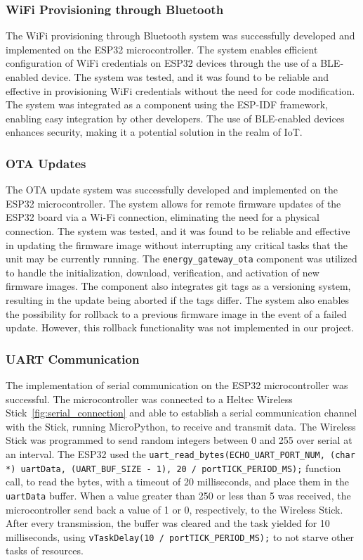\subsubsection{WiFi Provisioning through Bluetooth}

The WiFi provisioning through Bluetooth system was successfully developed and implemented on the ESP32 microcontroller. The system enables efficient configuration of WiFi credentials on ESP32 devices through the use of a BLE-enabled device. The system was tested, and it was found to be reliable and effective in provisioning WiFi credentials without the need for code modification. The system was integrated as a component using the ESP-IDF framework, enabling easy integration by other developers. The use of BLE-enabled devices enhances security, making it a potential solution in the realm of IoT.

\subsubsection{OTA Updates}

The OTA update system was successfully developed and implemented on the ESP32 microcontroller. The system allows for remote firmware updates of the ESP32 board via a Wi-Fi connection, eliminating the need for a physical connection. The system was tested, and it was found to be reliable and effective in updating the firmware image without interrupting any critical tasks that the unit may be currently running. The \texttt{energy\_gateway\_ota} component was utilized to handle the initialization, download, verification, and activation of new firmware images. The component also integrates git tags as a versioning system, resulting in the update being aborted if the tags differ. The system also enables the possibility for rollback to a previous firmware image in the event of a failed update. However, this rollback functionality was not implemented in our project.

\subsubsection{UART Communication}

The implementation of serial communication on the ESP32 microcontroller was successful. The microcontroller was connected to a Heltec Wireless Stick~\ref{fig:serial_connection} and able to establish a serial communication channel with the Stick, running MicroPython, to receive and transmit data. The Wireless Stick was programmed to send random integers between 0 and 255 over serial at an interval. The ESP32 used the \texttt{uart\_read\_bytes(ECHO\_UART\_PORT\_NUM, (char *) uartData, (UART\_BUF\_SIZE - 1), 20 / portTICK\_PERIOD\_MS);} function call, to read the bytes, with a timeout of 20 milliseconds, and place them in the \texttt{uartData} buffer. When a value greater than 250 or less than 5 was received, the microcontroller send back a value of 1 or 0, respectively, to the Wireless Stick. After every transmission, the buffer was cleared and the task yielded for 10 milliseconds, using \texttt{vTaskDelay(10 / portTICK\_PERIOD\_MS);} to not starve other tasks of resources.

